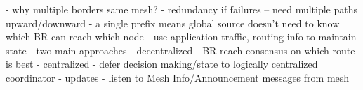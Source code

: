 \if
- why multiple borders same mesh?
    - redundancy if failures -- need multiple paths upward/downward
    - a single prefix means global source doesn't need to know which BR can reach which node
    - use application traffic, routing info to maintain state
- two main approaches
    - decentralized
        - BR reach consensus on which route is best
    - centralized
        - defer decision making/state to logically centralized coordinator
- updates
    - listen to Mesh Info/Announcement messages from mesh
\fi



